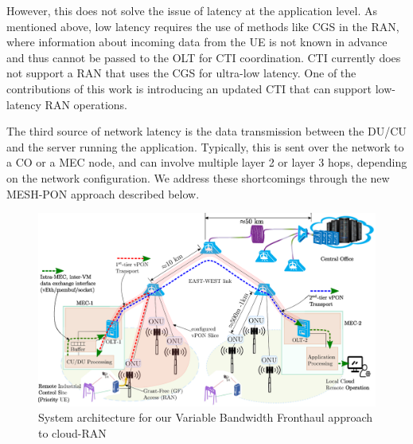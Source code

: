 \documentclass[a4paper, oneside, twocolumn, notitlepage, 10pt]{extarticle_ecoc}
\begin{document}
 	However, this does not solve the issue of latency at the application level. As mentioned above, low latency requires the use of methods like \ac{CGS} in the RAN, where information about incoming data from the UE is not known in advance and thus cannot be passed to the OLT for CTI coordination. %
 	CTI currently does not support a RAN that uses the CGS for ultra-low latency. One of the contributions of this work is introducing an updated CTI that can support low-latency RAN operations. %
 	
 	The third source of network latency is the data transmission between the DU/CU and the server running the application. Typically, this is sent over the network to a \ac{CO} or a \ac{MEC} node, and can involve multiple layer 2 or layer 3 hops, depending on the network configuration. We address these shortcomings through the new MESH-PON approach described below. %
 	\begin{figure}[h]
 	    \centering
    	\includegraphics[clip, trim={0, 0, 0, 0}, width=0.87\linewidth]{./Figures/SystemArc}
    	\caption{System architecture for our Variable Bandwidth Fronthaul approach to cloud-RAN}
    	\label{fig:SystemArc}
    \end{figure}
	
\end{document}
